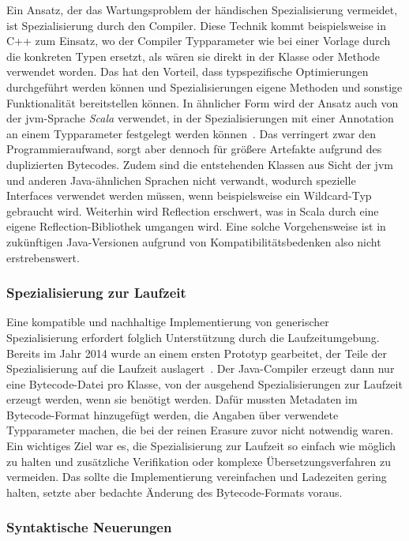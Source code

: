 Ein Ansatz, der das Wartungsproblem der händischen Spezialisierung vermeidet, ist Spezialisierung durch den Compiler.
Diese Technik kommt beispielsweise in C++ zum Einsatz, wo der Compiler Typparameter wie bei einer Vorlage durch die konkreten Typen ersetzt, als wären sie direkt in der Klasse oder Methode verwendet worden.
Das hat den Vorteil, dass typspezifische Optimierungen durchgeführt werden können und Spezialisierungen eigene Methoden und sonstige Funktionalität bereitstellen können.
In ähnlicher Form wird der Ansatz auch von der \ac{jvm}-Sprache \emph{Scala} verwendet, in der Spezialisierungen mit einer Annotation an einem Typparameter festgelegt werden können~\cite{scala-specialized}.
Das verringert zwar den Programmieraufwand, sorgt aber dennoch für größere Artefakte aufgrund des duplizierten Bytecodes.
Zudem sind die entstehenden Klassen aus Sicht der \ac{jvm} und anderen Java-ähnlichen Sprachen nicht verwandt, wodurch spezielle Interfaces verwendet werden müssen, wenn beispielsweise ein Wildcard-Typ gebraucht wird.
Weiterhin wird Reflection erschwert, was in Scala durch eine eigene Reflection-Bibliothek umgangen wird.
Eine solche Vorgehensweise ist in zukünftigen Java-Versionen aufgrund von Kompatibilitätsbedenken also nicht erstrebenswert.

\subsubsection{Spezialisierung zur Laufzeit}

Eine kompatible und nachhaltige Implementierung von generischer Spezialisierung erfordert folglich Unterstützung durch die Laufzeitumgebung.
Bereits im Jahr 2014 wurde an einem ersten Prototyp gearbeitet, der Teile der Spezialisierung auf die Laufzeit auslagert~\cite{specialization}.
Der Java-Compiler erzeugt dann nur eine Bytecode-Datei pro Klasse, von der ausgehend Spezialisierungen zur Laufzeit erzeugt werden, wenn sie benötigt werden.
Dafür mussten Metadaten im Bytecode-Format hinzugefügt werden, die Angaben über verwendete Typparameter machen, die bei der reinen Erasure zuvor nicht notwendig waren.
Ein wichtiges Ziel war es, die Spezialisierung zur Laufzeit so einfach wie möglich zu halten und zusätzliche Verifikation oder komplexe Übersetzungsverfahren zu vermeiden.
Das sollte die Implementierung vereinfachen und Ladezeiten gering halten, setzte aber bedachte Änderung des Bytecode-Formats voraus.

\subsubsection{Syntaktische Neuerungen}

